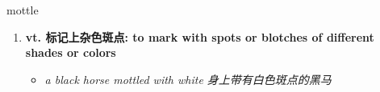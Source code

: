 
\begin{frame}
{\huge mottle}
\begin{center}
\begin{enumerate}\Large
  \item \textbf{vt. 标记上杂色斑点: to mark with spots or blotches of different shades or colors}
  \begin{itemize}
    \item \em{\Large{a black horse mottled with white 身上带有白色斑点的黑马}}
  \end{itemize}
\end{enumerate}
\end{center}
\end{frame}
